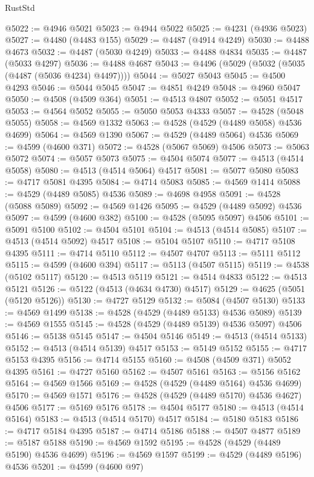 \begin{lexlean}{RustStd}
\begin{coremodule}
@5022 := @4946 @5021
@5023 := @4944 @5022
@5025 := @4231 (@4936 @5023)
@5027 := @4480 (@4483 @155)
@5029 := @4487 (@4914 @4249)
@5030 := @4488 @4673
@5032 := @4487 (@5030 @4249)
@5033 := @4488 @4834
@5035 := @4487 (@5033 @4297)
@5036 := @4488 @4687
@5043 := @4496 (@5029 (@5032 (@5035 (@4487 (@5036 @4234) @4497))))
@5044 := @5027 @5043
@5045 := @4500 @4293
@5046 := @5044 @5045
@5047 := @4851 @4249
@5048 := @4960 @5047
@5050 := @4508 (@4509 @364)
@5051 := @4513 @4807
@5052 := @5051 @4517
@5053 := @4564 @5052
@5055 := @5050 @5053 @4333
@5057 := @4528 (@5048 @5055)
@5058 := @4569 @1332
@5063 := @4528 (@4529 (@4489 @5058) @4536 @4699)
@5064 := @4569 @1390
@5067 := @4529 (@4489 @5064) @4536
@5069 := @4599 (@4600 @371)
@5072 := @4528 (@5067 @5069) @4506
@5073 := @5063 @5072
@5074 := @5057 @5073
@5075 := @4504 @5074
@5077 := @4513 (@4514 @5058)
@5080 := @4513 (@4514 @5064) @4517
@5081 := @5077 @5080
@5083 := @4717 @5081 @4395
@5084 := @4714 @5083
@5085 := @4569 @1414
@5088 := @4529 (@4489 @5085) @4536
@5089 := @4698 @4958
@5091 := @4528 (@5088 @5089)
@5092 := @4569 @1426
@5095 := @4529 (@4489 @5092) @4536
@5097 := @4599 (@4600 @382)
@5100 := @4528 (@5095 @5097) @4506
@5101 := @5091 @5100
@5102 := @4504 @5101
@5104 := @4513 (@4514 @5085)
@5107 := @4513 (@4514 @5092) @4517
@5108 := @5104 @5107
@5110 := @4717 @5108 @4395
@5111 := @4714 @5110
@5112 := @4507 @4707
@5113 := @5111 @5112
@5115 := @4599 (@4600 @394)
@5117 := @5113 (@4507 @5115)
@5119 := @4538 (@5102 @5117)
@5120 := @4513 @5119
@5121 := @4514 @4833
@5122 := @4513 @5121
@5126 := @5122 (@4513 (@4634 @4730) @4517)
@5129 := @4625 (@5051 (@5120 @5126))
@5130 := @4727 @5129
@5132 := @5084 (@4507 @5130)
@5133 := @4569 @1499
@5138 := @4528 (@4529 (@4489 @5133) @4536 @5089)
@5139 := @4569 @1555
@5145 := @4528 (@4529 (@4489 @5139) @4536 @5097) @4506
@5146 := @5138 @5145
@5147 := @4504 @5146
@5149 := @4513 (@4514 @5133)
@5152 := @4513 (@4514 @5139) @4517
@5153 := @5149 @5152
@5155 := @4717 @5153 @4395
@5156 := @4714 @5155
@5160 := @4508 (@4509 @371) @5052 @4395
@5161 := @4727 @5160
@5162 := @4507 @5161
@5163 := @5156 @5162
@5164 := @4569 @1566
@5169 := @4528 (@4529 (@4489 @5164) @4536 @4699)
@5170 := @4569 @1571
@5176 := @4528 (@4529 (@4489 @5170) @4536 @4627) @4506
@5177 := @5169 @5176
@5178 := @4504 @5177
@5180 := @4513 (@4514 @5164)
@5183 := @4513 (@4514 @5170) @4517
@5184 := @5180 @5183
@5186 := @4717 @5184 @4395
@5187 := @4714 @5186
@5188 := @4507 @4877
@5189 := @5187 @5188
@5190 := @4569 @1592
@5195 := @4528 (@4529 (@4489 @5190) @4536 @4699)
@5196 := @4569 @1597
@5199 := @4529 (@4489 @5196) @4536
@5201 := @4599 (@4600 @97)

\end{coremodule}
\end{lexlean}
